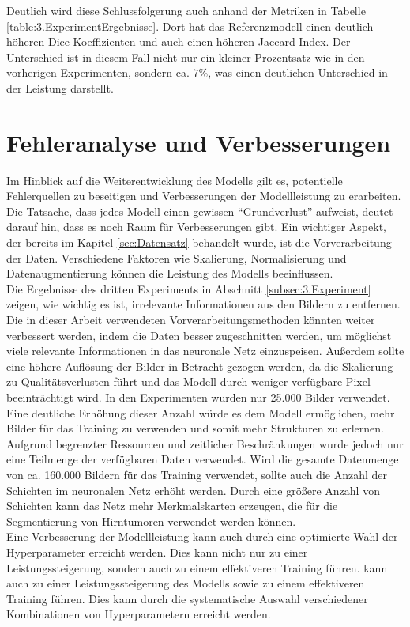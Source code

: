 Deutlich wird diese Schlussfolgerung auch anhand der Metriken in Tabelle \ref{table:3.ExperimentErgebnisse}. Dort hat das Referenzmodell einen deutlich höheren Dice-Koeffizienten und auch einen höheren Jaccard-Index. Der Unterschied ist in diesem Fall nicht nur ein kleiner Prozentsatz wie in den vorherigen Experimenten, sondern ca. $7\%$, was einen deutlichen Unterschied in der Leistung darstellt.



\section{Fehleranalyse und Verbesserungen}
Im Hinblick auf die Weiterentwicklung des Modells gilt es, potentielle Fehlerquellen zu beseitigen und Verbesserungen der Modellleistung zu erarbeiten. Die Tatsache, dass jedes Modell einen gewissen ``Grundverlust'' aufweist, deutet darauf hin, dass es noch Raum für Verbesserungen gibt. Ein wichtiger Aspekt, der bereits im Kapitel \ref{sec:Datensatz} behandelt wurde, ist die Vorverarbeitung der Daten. Verschiedene Faktoren wie Skalierung, Normalisierung und Datenaugmentierung können die Leistung des Modells beeinflussen.\\
Die Ergebnisse des dritten Experiments in Abschnitt \ref{subsec:3.Experiment} zeigen, wie wichtig es ist, irrelevante Informationen aus den Bildern zu entfernen. Die in dieser Arbeit verwendeten Vorverarbeitungsmethoden könnten weiter verbessert werden, indem die Daten besser zugeschnitten werden, um möglichst viele relevante Informationen in das neuronale Netz einzuspeisen. Außerdem sollte eine höhere Auflösung der Bilder in Betracht gezogen werden, da die Skalierung zu Qualitätsverlusten führt und das Modell durch weniger verfügbare Pixel beeinträchtigt wird.
In den Experimenten wurden nur 25.000 Bilder verwendet. Eine deutliche Erhöhung dieser Anzahl würde es dem Modell ermöglichen, mehr Bilder für das Training zu verwenden und somit mehr Strukturen zu erlernen. Aufgrund begrenzter Ressourcen und zeitlicher Beschränkungen wurde jedoch nur eine Teilmenge der verfügbaren Daten verwendet. Wird die gesamte Datenmenge von ca. 160.000 Bildern für das Training verwendet, sollte auch die Anzahl der Schichten im neuronalen Netz erhöht werden. Durch eine größere Anzahl von Schichten kann das Netz mehr Merkmalskarten erzeugen, die für die Segmentierung von Hirntumoren verwendet werden können. \cite[vgl.][]{Teoh2023}\\
Eine Verbesserung der Modellleistung kann auch durch eine optimierte Wahl der Hyperparameter erreicht werden. Dies kann nicht nur zu einer Leistungssteigerung, sondern auch zu einem effektiveren Training führen. kann auch zu einer Leistungssteigerung des Modells sowie zu einem effektiveren Training führen. Dies kann durch die systematische Auswahl verschiedener Kombinationen von Hyperparametern erreicht werden. 



